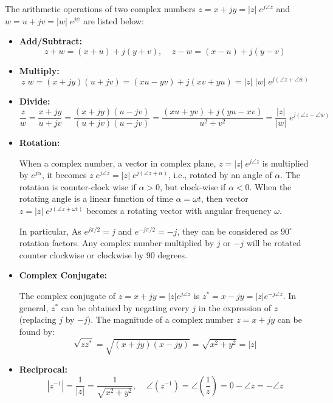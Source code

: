 \documentclass{article}
\begin{document}
The arithmetic operations of two complex numbers $z=x+jy=|z|\;e^{j\angle z}$ 
and $w=u+jv=|w|\;e^{j\psi}$ are listed below:
\begin{itemize}
\item {\bf Add/Subtract:} 
  \begin{equation}	
    z+w=(x+u)+j(y+v),\;\;\;\;z-w=(x-u)+j(y-v)	
  \end{equation}

\item {\bf Multiply:}
  \begin{equation}
    z\;w=(x+jy)(u+jv)=(xu-yv)+j(xv+yu)=|z|\;|w|\;e^{j(\angle z+\angle w)} 
  \end{equation}

\item {\bf Divide:}
  \begin{equation}	
    \frac{z}{w}=\frac{x+jy}{u+jv}=\frac{(x+jy)(u-jv)}{(u+jv)(u-jv)}
    =\frac{(xu+yv)+j(yu-xv)}{u^2+v^2}
    =\frac{|z|}{|w|}\;e^{j(\angle z-\angle w)}	
  \end{equation}

\item {\bf Rotation:}

  When a complex number, a vector in complex plane, $z=|z|\;e^{j\angle z}$ is
  multiplied by $e^{j\alpha}$, it becomes $z\;e^{j\angle z}=|z|\;e^{j(\angle z+\alpha)}$, 
  i.e., rotated by an angle of $\alpha$. The rotation is counter-clock wise
  if $\alpha>0$, but clock-wise if $\alpha<0$. When the rotating angle is a 
  linear function of time $\alpha=\omega t$, then vector
  $z=|z|\;e^{j(\angle z+\omega t)}$ becomes a rotating vector with angular frequency
  $\omega$.

  In particular, As $e^{j\pi/2}=j$ and $e^{-j\pi/2}=-j$, they can be considered 
  as $90^\circ$ rotation factors. Any complex number multiplied by $j$ or $-j$ 
  will be rotated counter clockwise or clockwise by 90 degrees.

\item {\bf Complex Conjugate:}

  The complex conjugate of $z=x+jy=|z|e^{j\angle z}$ is 
  $z^*=x-jy=|z|e^{-j\angle z} $. In general, $z^*$ can be obtained by
  negating every $j$ in the expression of $z$ (replacing $j$ by $-j$). 
  The magnitude of a complex number $z=x+jy$ can be found by:
  \begin{equation}	
    \sqrt{zz^*}=\sqrt{(x+jy)(x-jy)}=\sqrt{x^2+y^2}=|z|
  \end{equation}

\item {\bf Reciprocal:}
  \begin{equation}	
    |z^{-1}|=\frac{1}{|z|}=\frac{1}{\sqrt{x^2+y^2}},\;\;\;\;
    \angle\left(z^{-1}\right)=\angle\left(\frac{1}{z}\right)
    =0-\angle{z}=-\angle z	
  \end{equation}

\end{itemize}
\end{document}
